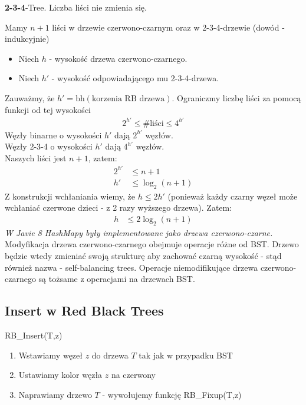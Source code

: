 \documentclass{article}
\numberwithin{equation}{subsection}
\begin{document}
\noindent
\textbf{2-3-4}-Tree. Liczba liści nie zmienia się.

\noindent
Mamy $n+1$ liści w drzewie czerwono-czarnym oraz w 2-3-4-drzewie (dowód - indukcyjnie)
\begin{itemize}
    \item Niech $h$ - wysokość drzewa czerwono-czarnego.
    \item Niech $h'$ - wysokość odpowiadającego mu 2-3-4-drzewa.
\end{itemize}
Zauważmy, że $h' = \text{bh}(\text{korzenia RB drzewa})$. Ograniczmy liczbę liści za pomocą funkcji od tej wysokości
\begin{align}
    2^{h'} \leq \# \text{liści} \leq 4^{h'}
\end{align}
Węzły binarne o wysokości $h'$ dają $2^{h'}$ węzłów.\\
Węzły 2-3-4 o wysokości $h'$ dają $4^{h'}$ węzłów.\\
Naszych liści jest $n+1$, zatem:
\begin{align}
    2^{h'} &\leq n+1\\
    h' &\leq \log_2(n+1)
\end{align}
Z konstrukcji wchłaniania wiemy, że $h \leq 2h'$ (ponieważ każdy czarny węzeł może wchłaniać czerwone dzieci - z 2 razy wyższego drzewa). Zatem:
\begin{align}
    h &\leq 2 \log_2(n+1)
\end{align}
\textit{W Javie 8 HashMapy były implementowane jako drzewa czerwono-czarne.}\\

\noindent
Modyfikacja drzewa czerwono-czarnego obejmuje operacje różne od BST.
Drzewo będzie wtedy zmieniać swoją strukturę aby zachować czarną wysokość - stąd również nazwa - self-balancing trees.
Operacje niemodifikujące drzewa czerwono-czarnego są tożsame z operacjami na drzewach BST.

\subsection{Insert w Red Black Trees}

RB\_Insert(T,z)
\begin{enumerate}
    \item Wstawiamy węzeł $z$ do drzewa $T$ tak jak w przypadku BST
    \item Ustawiamy kolor węzła $z$ na czerwony
    \item Naprawiamy drzewo $T$ - wywołujemy funkcję RB\_Fixup(T,z)
\end{enumerate}
\end{document}
